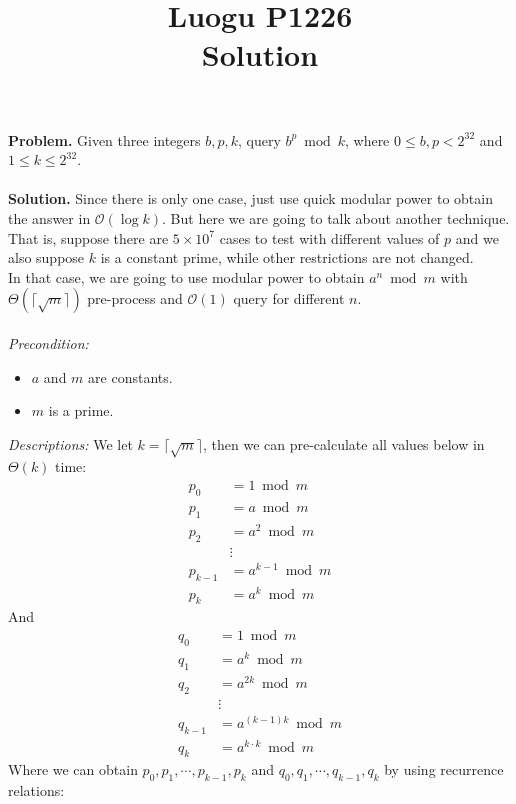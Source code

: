 \documentclass[11pt, letterpaper]{article}
\begin{document}
\title{Luogu P1226 \\ Solution}
\date{}

\maketitle

\textbf{Problem. }Given three integers $b, p, k$, query $b^{p}\bmod k$, where $0 \leq b, p < 2^{32}$ and $1 \leq k \leq 2^{32}$.\\\\
\textbf{Solution. }Since there is only one case, just use quick modular power to obtain the answer in $\mathcal{O}(\log k)$. But here we are going to talk about another technique. That is, suppose there are $5 \times 10^{7}$ cases to test with different values of $p$ and we also suppose $k$ is a constant prime, while other restrictions are not changed. \\In that case, we are going to use modular power to obtain $a^{n}\bmod{m}$ with $\Theta(\lceil \sqrt{m} \rceil)$
pre-process and $\mathcal{O}(1)$ query for different $n$.\\\\
\emph{Precondition: }
\begin{itemize}
\item $a$ and $m$ are constants.
\item $m$ is a prime.
\end{itemize}
\emph{Descriptions: }We let $k = \lceil \sqrt{m} \rceil$, then we can pre-calculate all values below in $\Theta(k)$
time:
\begin{align*}
p_{0}   &=  1 \bmod m \\
p_{1}   &=  a \bmod m\\
p_{2}   &= a^{2} \bmod m\\
& \vdots \\
p_{k-1} &= a^{k-1} \bmod m\\
p_{k}   &= a^{k} \bmod m
\end{align*}
And
\begin{align*}
q_{0}   &=  1 \bmod m\\
q_{1}   &= a^{k} \bmod m\\
q_{2}   &= a^{2k} \bmod m\\
& \vdots \\
q_{k-1} &= a^{(k-1)k} \bmod m\\
q_{k}   &= a^{k \cdot k} \bmod m
\end{align*}
Where we can obtain $p_{0}, p_{1}, \cdots , p_{k-1}, p_{k}$ and $q_{0}, q_{1}, \cdots , q_{k-1}, q_{k}$ by using recurrence relations:
\end{document}
